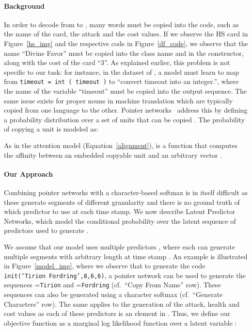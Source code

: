 \documentclass[11pt]{article}
\begin{document}
\paragraph{Background} In order to decode from  to , many words must be copied into the code,
such as the name of the card, the attack and the cost values. If we observe the HS
card in Figure~\ref{hs_img} and the respective code in Figure~\ref{df_code}, we observe that the
name ``Divine Favor'' must be copied into the class name and in the constructor,
along with the cost of the card ``3''.
As explained earlier, this problem is not specific to our task: for instance, in
the dataset of , a model must learn to map from \texttt{timeout = int
( timeout )} to ``convert timeout into an integer.'', where the name of the
variable ``timeout'' must be copied into the output sequence. The same issue
exists for proper nouns in machine translation which are typically copied
from one language to the other. Pointer networks~\cite{NIPS2015_5866} address this by
defining a probability distribution over a set of units that can be copied
. The probability of copying a unit  is modeled as:

As in the attention model (Equation~\ref{alignment}),
 is a function that computes the affinity between
an embedded copyable unit  and an arbitrary vector .

\paragraph{Our Approach} Combining pointer networks with a character-based softmax is in itself difficult as these generate segments of different granularity and there is no ground truth of which predictor to use at each time stamp.
We now describe Latent Predictor Networks, which model the conditional probability  over the latent sequence of predictors used to generate .

We assume that our model uses multiple predictors , where each 
can generate multiple segments  with arbitrary length  at
time stamp . An example is illustrated in Figure~\ref{model_img}, where we
observe that to generate the code \texttt{init(`Tirion Fordring',8,6,6)}, a
pointer network can be used to generate the sequences =\texttt{Tirion} and
=\texttt{Fordring} (cf.~``Copy From Name'' row). These sequences can also be
generated using a character softmax (cf.~``Generate Characters'' row). The same
applies to the generation of the attack, health and cost values as each of these
predictors is an element in . Thus, we define our objective function as a
marginal log likelihood function over a latent variable :
\end{document}
